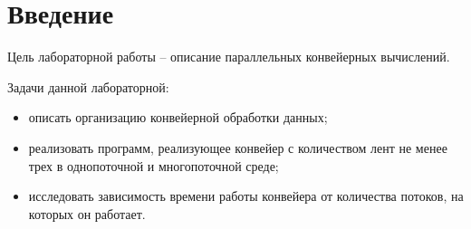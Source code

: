 \chapter*{Введение}

Цель лабораторной работы -- описание параллельных конвейерных вычислений. 

Задачи данной лабораторной:
\begin{itemize}
	\item описать организацию конвейерной обработки данных;
	\item реализовать программ, реализующее конвейер с количеством лент не менее трех в однопоточной и многопоточной среде;
	\item исследовать зависимость времени работы конвейера от количества потоков, на которых он работает. 
\end{itemize}
